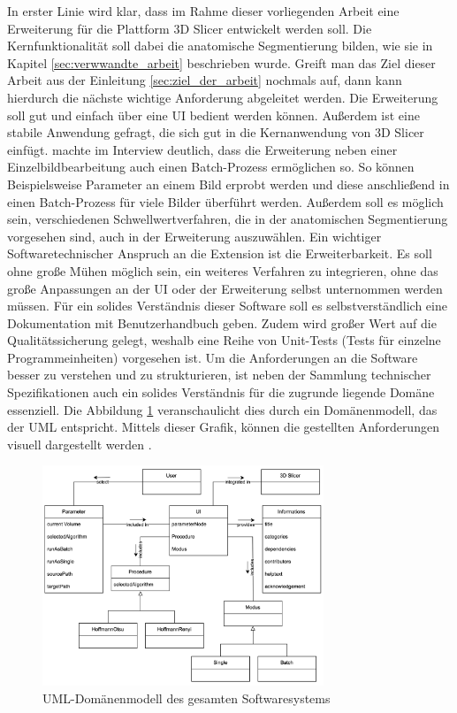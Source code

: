 In erster Linie wird klar, dass im Rahme dieser vorliegenden Arbeit eine
Erweiterung für die Plattform 3D Slicer entwickelt werden soll. Die Kernfunktionalität
soll dabei die anatomische Segmentierung bilden, wie sie in Kapitel
\ref{sec:verwwandte_arbeit} beschrieben wurde. Greift man das Ziel dieser Arbeit
aus der Einleitung \ref{sec:ziel_der_arbeit} nochmals auf, dann kann hierdurch
die nächste wichtige Anforderung abgeleitet werden. Die Erweiterung soll gut und
einfach über eine \ac{UI} bedient werden können. Außerdem ist eine stabile Anwendung
gefragt, die sich gut in die Kernanwendung von 3D Slicer einfügt. \citet[]{walter2025}
machte im Interview deutlich, dass die Erweiterung neben einer Einzelbildbearbeitung
auch einen Batch-Prozess ermöglichen so. So können Beispielsweise Parameter an
einem Bild erprobt werden und diese anschließend in einen Batch-Prozess für
viele Bilder überführt werden. Außerdem soll es möglich sein, verschiedenen
Schwellwertverfahren, die in der anatomischen Segmentierung vorgesehen sind,
auch in der Erweiterung auszuwählen. Ein wichtiger Softwaretechnischer Anspruch an
die Extension ist die Erweiterbarkeit. Es soll ohne große Mühen möglich sein, ein
weiteres Verfahren zu integrieren, ohne das große Anpassungen an der UI oder der
Erweiterung selbst unternommen werden müssen. Für ein solides Verständnis dieser
Software soll es selbstverständlich eine Dokumentation mit Benutzerhandbuch geben.
Zudem wird großer Wert auf die Qualitätssicherung gelegt, weshalb eine Reihe von
Unit-Tests (Tests für einzelne Programmeinheiten) vorgesehen ist. Um die
Anforderungen an die Software besser zu verstehen und zu strukturieren, ist neben
der Sammlung technischer Spezifikationen auch ein solides Verständnis für die zugrunde
liegende Domäne essenziell. Die Abbildung \ref{fig:3d_slicer_domäne}
veranschaulicht dies durch ein Domänenmodell, das der \ac{UML} entspricht. Mittels
dieser Grafik, können die gestellten Anforderungen visuell dargestellt werden
\citep[vgl.][]{walter2025}.

\begin{figure}[h]
	\centering
	\includegraphics[width=0.75\textwidth]{img/domaenenmodell.jpg}
	\caption{\ac{UML}-Domänenmodell des gesamten Softwaresystems}
	\label{fig:3d_slicer_domäne}
\end{figure}

